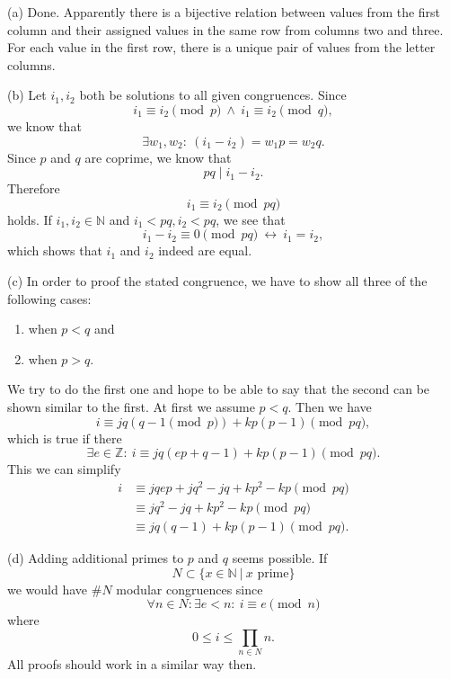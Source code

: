 \documentclass[12pt]{article}
\begin{document}
 (a) Done. Apparently there is a bijective relation between values from the first column and their assigned values in the same row from columns two and three. For each value in the first row, there is a unique pair of values from the letter columns.

 (b) Let $i_1,i_2$ both be solutions to all given congruences. Since \begin{equation}
 	i_1\equiv i_2\pmod{p}\ \land\ i_1\equiv i_2\pmod{q},
 \end{equation} we know that \begin{equation}
 	\exists w_1,w_2:\ (i_1-i_2)=w_1p=w_2q.
 \end{equation} Since $p$ and $q$ are coprime, we know that \begin{equation}
 	pq \mid i_1-i_2.
 \end{equation} Therefore \begin{equation}
 	i_1\equiv i_2\pmod{pq}
 \end{equation} holds. If $i_1,i_2\in\mathbb{N}$ and $i_1<pq, i_2<pq$, we see that \begin{equation}
 	i_1-i_2\equiv 0 \pmod{pq}\ \leftrightarrow\ i_1=i_2,
 \end{equation} which shows that $i_1$ and $i_2$ indeed are equal.
 
 (c) In order to proof the stated congruence, we have to show all three of the following cases: \begin{enumerate}
 	\item when $p<q$ and
 	\item when $p>q$.
 \end{enumerate} We try to do the first one and hope to be able to say that the second can be shown similar to the first. At first we assume $p<q$. Then we have \begin{equation}
 	i \equiv jq (q-1 \pmod p)+kp (p-1) \pmod{pq},
 \end{equation} which is true if there \begin{equation}
 	\exists e\in\mathbb{Z}:\ i \equiv jq (ep+q-1)+kp(p-1) \pmod{pq}.
 \end{equation} This we can simplify \begin{align}
 	i &\equiv jqep +jq^2-jq+kp^2-kp \pmod{pq} \\
 	&\equiv jq^2-jq+kp^2-kp \pmod{pq} \\
	&\equiv jq(q-1)+kp(p-1) \pmod{pq}.
 \end{align}
 
 
 (d) Adding additional primes to $p$ and $q$ seems possible. If \begin{equation}
 	N\subset\{x\in\mathbb{N}\ |\ x\textrm{ prime}\}
 \end{equation} we would have $\#N$ modular congruences since \begin{equation}
 	\forall n\in N: \exists e<n:\ i\equiv e \pmod{n}
 \end{equation} where \begin{equation}
 	0\leq i\leq \prod_{n\in N}n.
 \end{equation} All proofs should work in a similar way then.
 
\end{document}
